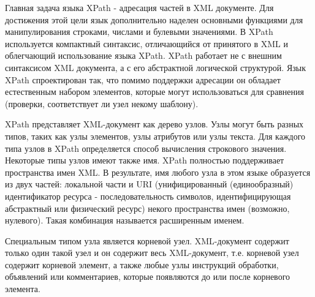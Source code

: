 \documentclass[12pt,a4paper,oneside]{article} %
\begin{document}
Главная задача языка XPath - адресация частей в XML документе. Для \linebreak
достижения этой цели язык дополнительно наделен основными функциями \linebreak
для манипулирования строками, числами и булевыми значениями. В XPath \linebreak
используется компактный синтаксис, отличающийся от принятого в XML \linebreak
и облегчающий использование языка XPath. XPath работает не с внешним \linebreak
синтаксисом XML документа, а с его абстрактной логической структурой. \linebreak
Язык XPath спроектирован так, что помимо поддержки адресации он \linebreak
обладает естественным набором элементов, которые могут использоваться \linebreak
для сравнения (проверки, соответствует ли узел некому шаблону).

XPath представляет XML-документ как дерево узлов. Узлы могут быть \linebreak
разных типов, таких как узлы элементов, узлы атрибутов или узлы \linebreak
текста. Для каждого типа узлов в XPath определяется способ вычисления \linebreak
строкового значения. Некоторые типы узлов имеют также имя. XPath \linebreak
полностью поддерживает пространства имен XML. В результате, имя любого \linebreak
узла в этом языке образуется из двух частей: локальной части и URI \linebreak
(унифицированный (единообразный) идентификатор ресурса - \linebreak
последовательность символов, идентифицирующая абстрактный или \linebreak
физический ресурс) некого пространства имен (возможно, нулевого). \linebreak
Такая комбинация называется расширенным именем.

Специальным типом узла является корневой узел. XML-документ \linebreak
содержит только один такой узел и он содержит весь XML-документ, \linebreak
т.е. корневой узел содержит корневой элемент, а также любые узлы \linebreak
инструкций обработки, объявлений или комментариев, которые \linebreak
появляются до или после корневого элемента.
\end{document}
